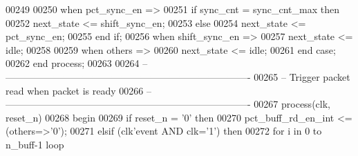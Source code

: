 \begin{DoxyCode}
00249          
00250       \textcolor{keywordflow}{when} \textcolor{vhdlchar}{pct\_sync\_en} \textcolor{vhdlchar}{=}\textcolor{vhdlchar}{>} 
00251          \textcolor{keywordflow}{if} \textcolor{vhdlchar}{sync_cnt} \textcolor{vhdlchar}{=} \textcolor{vhdlchar}{sync_cnt_max} \textcolor{keywordflow}{then} 
00252             \textcolor{vhdlchar}{next_state} \textcolor{vhdlchar}{<=} \textcolor{vhdlchar}{shift\_sync\_en};
00253          \textcolor{keywordflow}{else}
00254             \textcolor{vhdlchar}{next_state} \textcolor{vhdlchar}{<=} \textcolor{vhdlchar}{pct\_sync\_en};
00255          \textcolor{keywordflow}{end} \textcolor{keywordflow}{if};
00256       \textcolor{keywordflow}{when} \textcolor{vhdlchar}{shift\_sync\_en} \textcolor{vhdlchar}{=}\textcolor{vhdlchar}{>}
00257          \textcolor{vhdlchar}{next_state} \textcolor{vhdlchar}{<=} \textcolor{vhdlchar}{idle};
00258          
00259         \textcolor{keywordflow}{when} \textcolor{keywordflow}{others} \textcolor{vhdlchar}{=}\textcolor{vhdlchar}{>} 
00260             \textcolor{vhdlchar}{next_state} \textcolor{vhdlchar}{<=} \textcolor{vhdlchar}{idle};
00261     \textcolor{keywordflow}{end} \textcolor{keywordflow}{case};
00262 \textcolor{keywordflow}{end} \textcolor{keywordflow}{process};
00263 
00264 \textcolor{keyword}{-- ----------------------------------------------------------------------------}
00265 \textcolor{keyword}{-- Trigger packet read when packet is ready}
00266 \textcolor{keyword}{-- ----------------------------------------------------------------------------}
00267 \textcolor{keywordflow}{process}(clk, reset_n)
00268 \textcolor{vhdlkeyword}{begin}
00269    \textcolor{keywordflow}{if} \textcolor{vhdlchar}{reset_n} \textcolor{vhdlchar}{=} \textcolor{vhdlchar}{'}\textcolor{vhdllogic}{}\textcolor{vhdllogic}{0}\textcolor{vhdlchar}{'} \textcolor{keywordflow}{then} 
00270       \textcolor{vhdlchar}{pct_buff_rd_en_int} \textcolor{vhdlchar}{<=} \textcolor{vhdlchar}{(}\textcolor{keywordflow}{others}\textcolor{vhdlchar}{=}\textcolor{vhdlchar}{>}\textcolor{vhdlchar}{'}\textcolor{vhdllogic}{}\textcolor{vhdllogic}{0}\textcolor{vhdlchar}{'}\textcolor{vhdlchar}{)};
00271    \textcolor{keywordflow}{elsif} \textcolor{vhdlchar}{(}\textcolor{vhdlchar}{clk}\textcolor{vhdlchar}{'}\textcolor{vhdlkeyword}{event} \textcolor{keywordflow}{AND} \textcolor{vhdlchar}{clk}\textcolor{vhdlchar}{=}\textcolor{vhdlchar}{'}\textcolor{vhdllogic}{}\textcolor{vhdllogic}{1}\textcolor{vhdlchar}{'}\textcolor{vhdlchar}{)} \textcolor{keywordflow}{then} 
00272       \textcolor{keywordflow}{for} \textcolor{vhdlchar}{i} \textcolor{keywordflow}{in} \textcolor{vhdllogic}{}\textcolor{vhdllogic}{0} \textcolor{keywordflow}{to} \textcolor{vhdlchar}{n_buff}\textcolor{vhdlchar}{-}\textcolor{vhdllogic}{}\textcolor{vhdllogic}{1} \textcolor{keywordflow}{loop}

\end{DoxyCode}
